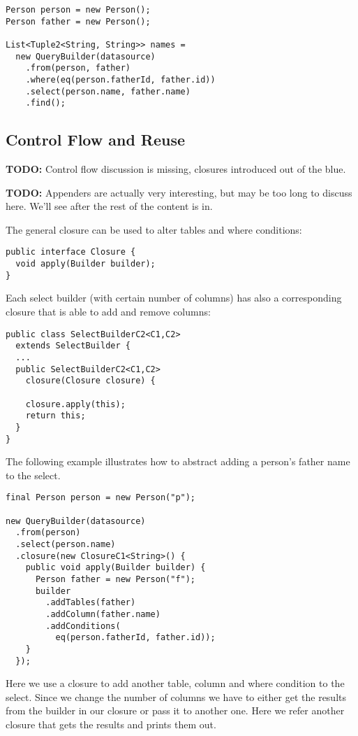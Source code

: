 \documentclass{sig-alternate}
\begin{document}
\begin{verbatim}
Person person = new Person();
Person father = new Person();

List<Tuple2<String, String>> names = 
  new QueryBuilder(datasource)
    .from(person, father)
    .where(eq(person.fatherId, father.id))
    .select(person.name, father.name)
    .find();
\end{verbatim}

\subsection{Control Flow and Reuse}

\textbf{TODO:} Control flow discussion is missing, closures introduced out of the blue. 

\textbf{TODO:} Appenders are actually very interesting, but may be too long to discuss here. We'll see after the rest of the content is in.

The general closure can be used to alter tables and where conditions:

\begin{verbatim}
public interface Closure {
  void apply(Builder builder);
}
\end{verbatim}

Each select builder (with certain number of columns) has also a corresponding closure that is able to add and remove columns:

\begin{verbatim}
public class SelectBuilderC2<C1,C2> 
  extends SelectBuilder {
  ...
  public SelectBuilderC2<C1,C2> 
    closure(Closure closure) {

    closure.apply(this);
    return this;
  }
}
\end{verbatim}

The following example illustrates how to abstract adding a person's father name to the select.

\begin{verbatim}
final Person person = new Person("p");

new QueryBuilder(datasource)
  .from(person)
  .select(person.name)
  .closure(new ClosureC1<String>() {
    public void apply(Builder builder) {
      Person father = new Person("f");
      builder
        .addTables(father)
        .addColumn(father.name)
        .addConditions(
          eq(person.fatherId, father.id));
    }
  });
\end{verbatim}

Here we use a closure to add another table, column and where condition to the select. Since we change the number of columns we have to either get the results from the builder in our closure or pass it to another one. Here we refer another closure that gets the results and prints them out.
\end{document}
